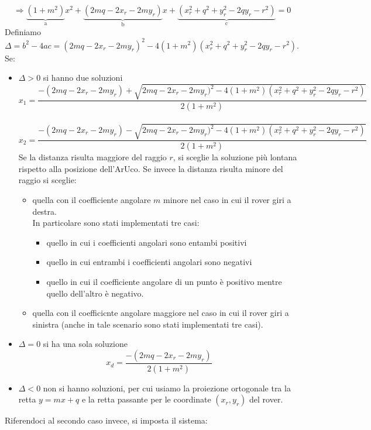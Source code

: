 \begin{equation*}
\Rightarrow \underbrace{(1+m^2)}_\text{a}x^2+\underbrace{(2mq-2x_r-2my_r)}_\text{b}x+\underbrace{(x_r^2+q^2+y_r^2-2qy_r-r^2)}_\text{c}=0
\end{equation*}
Definiamo $\Delta=b^2-4ac=(2mq-2x_r-2my_r)^2-4(1+m^2)(x_r^2+q^2+y_r^2-2qy_r-r^2)$. \\Se:
\begin{itemize}
    \item $\Delta>0$ si hanno due soluzioni
        \begin{equation}
        x_1=\frac{-(2mq-2x_r-2my_r)+\sqrt{2mq-2x_r-2my_r)^2-4(1+m^2)(x_r^2+q^2+y_r^2-2qy_r-r^2)}}{2(1+m^2)}
        \end{equation}
        \\
        \begin{equation}
        x_2=\frac{-(2mq-2x_r-2my_r)-\sqrt{2mq-2x_r-2my_r)^2-4(1+m^2)(x_r^2+q^2+y_r^2-2qy_r-r^2)}}{2(1+m^2)}
        \end{equation}
        Se la distanza risulta maggiore del raggio $r$, si sceglie la soluzione più lontana rispetto alla posizione dell'ArUco.
        Se invece la distanza risulta minore del raggio si sceglie: 
        \begin{itemize}
            \item quella con il coefficiente angolare $m$ minore nel caso in cui il rover giri a destra. \\In particolare sono stati implementati tre casi:
            \begin{itemize}
            \item quello in cui i coefficienti angolari sono entambi positivi
            \item quello in cui entrambi i coefficienti angolari sono negativi
            \item quello in cui il coefficiente angolare di un punto è positivo mentre quello dell'altro è negativo.
            \end{itemize}
            \item quella con il coefficicnte angolare maggiore nel caso in cui il rover giri a sinistra (anche in tale scenario sono stati implementati tre casi).
        \end{itemize}
    \item $\Delta=0$ si ha una sola soluzione
    \begin{equation}
        x_d=\frac{-(2mq-2x_r-2my_r)}{2(1+m^2)}
        \end{equation}
    \item $\Delta<0$ non si hanno soluzioni, per cui usiamo la proiezione ortogonale tra la retta $y=mx+q$ e la retta passante per le coordinate $(x_r, y_r)$ del rover.
\end{itemize}
Riferendoci al secondo caso invece, si imposta il sistema:

